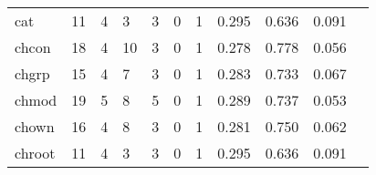 \begin{longtable}{lp{1.20cm}p{1.20cm}p{1.20cm}p{1.20cm}p{1.20cm}p{1.20cm}p{1.20cm}p{1.20cm}p{1.20cm}p{1.20cm}}
cat       &                                    11 &                                                  4 &                                                  3 &                                                  3 &                                                  0 &                                                  1 &                                         0.295 &                                              0.636 &                                              0.091 \\
chcon     &                                    18 &                                                  4 &                                                 10 &                                                  3 &                                                  0 &                                                  1 &                                         0.278 &                                              0.778 &                                              0.056 \\
chgrp     &                                    15 &                                                  4 &                                                  7 &                                                  3 &                                                  0 &                                                  1 &                                         0.283 &                                              0.733 &                                              0.067 \\
chmod     &                                    19 &                                                  5 &                                                  8 &                                                  5 &                                                  0 &                                                  1 &                                         0.289 &                                              0.737 &                                              0.053 \\
chown     &                                    16 &                                                  4 &                                                  8 &                                                  3 &                                                  0 &                                                  1 &                                         0.281 &                                              0.750 &                                              0.062 \\
chroot    &                                    11 &                                                  4 &                                                  3 &                                                  3 &                                                  0 &                                                  1 &                                         0.295 &                                              0.636 &                                              0.091 \\

\end{longtable}
